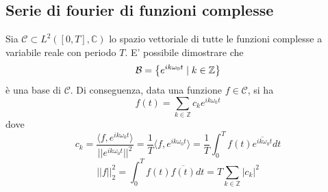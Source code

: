 \documentclass{article}
\begin{document}
    \subsection{Serie di fourier di funzioni complesse}
    Sia $\mathcal{C} \subset L^{2}([0, T], \mathbb{C})$ lo spazio vettoriale di tutte le funzioni complesse a variabile reale con periodo $T$.
    E' possibile dimostrare che 
    \[
        \mathcal{B} = \qty{ e^{ik\omega_{0}t} \; | \; k \in \mathbb{Z} }
    \]
    è una base di $\mathcal{C}$.
    Di conseguenza, data una funzione $f \in \mathcal{C}$, si ha
    \[
        f(t) = \sum_{k \in \mathbb{Z}} c_{k} e^{ik\omega_{0}t}
    \]
    dove 
    \[
        c_{k} = \frac{\langle f, e^{ik\omega_{0}t} \rangle}{||e^{ik\omega_{0}t}||^{2}} = \frac{1}{T} \langle f, e^{ik\omega_{0}t} \rangle  = \frac{1}{T} \int_{0}^{T} f(t) \overline{e^{ik\omega_{0}t}} dt
    \]
    \[
        ||f||^{2}_{2} = \int_{0}^{T} f(t) \overline{f(t)} dt = T \sum_{k \in \mathbb{Z}} |c_{k}|^{2}
    \]
\end{document}
